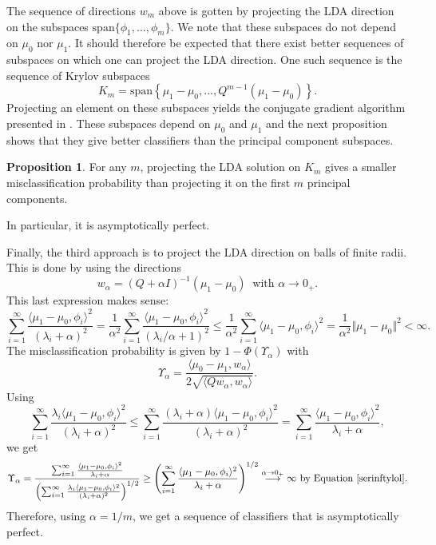 \documentclass[10pt, a4paper]{report}
\theoremstyle{definition}
\newtheorem{prop}{Proposition}
\theoremstyle{remark}
\begin{document}
The sequence of directions $w_m$ above is gotten by projecting the LDA direction on the subspaces $\mathrm{span}\{\phi_1,...,\phi_m\}$. We note that these subspaces do not depend on $\mu_0$ nor $\mu_1$. It should therefore be expected that there exist better sequences of subspaces on which one can project the LDA direction. One such sequence is the sequence of Krylov subspaces 
$$K_m = \mathrm{span}\left\{\mu_1-\mu_0,...,Q^{m-1}(\mu_1-\mu_0)\right\}.$$
Projecting an element on these subspaces yields the conjugate gradient algorithm presented in \cite[Algo.]{Kraus2}. These subspaces depend on $\mu_0$ and $\mu_1$ and the next proposition shows that they give better classifiers than the principal component subspaces. 
\begin{prop}\cite[Prop.]{Kraus2}
	For any $m$, projecting the LDA solution on $K_m$ gives a smaller misclassification probability than projecting it on the first $m$ principal components.
\end{prop}
In particular, it is asymptotically perfect.

Finally, the third approach is to project the LDA direction on balls of finite radii. This is done by using the directions 
$$w_\alpha = (Q + \alpha I)^{-1}(\mu_1-\mu_0) \ \text{ with } \alpha\to 0_+.$$  
This last expression makes sense:
$$\sum_{i=1}^{\infty} \frac{\langle \mu_1 -\mu_0, \phi_i\rangle^2 }{(\lambda_i + \alpha)^2} = \frac{1}{\alpha^2} \sum_{i=1}^{\infty} \frac{\langle \mu_1 -\mu_0, \phi_i\rangle^2 }{(\lambda_i/\alpha + 1)^2} \leq \frac{1}{\alpha^2} \sum_{i=1}^{\infty} \langle \mu_1 -\mu_0, \phi_i\rangle^2 = \frac{1}{\alpha^2}\Vert \mu_1-\mu_0 \Vert^2 < \infty.$$
The  misclassification probability is given by $1-\Phi(\Upsilon_\alpha)$ with
\begin{equation*}
	\Upsilon_\alpha  =  \frac{\langle\mu_0-\mu_1,w_\alpha\rangle}{2\sqrt{\langle Qw_\alpha,w_\alpha\rangle}}.
\end{equation*}
Using 
$$\sum_{i=1}^{\infty} \frac{\lambda_i \langle \mu_1 -\mu_0, \phi_i\rangle^2}{(\lambda_i + \alpha)^2} \leq \sum_{i=1}^{\infty} \frac{(\lambda_i+\alpha) \langle \mu_1 -\mu_0, \phi_i\rangle^2}{(\lambda_i + \alpha)^2} = \sum_{i=1}^{\infty} \frac{\langle \mu_1 -\mu_0, \phi_i\rangle^2}{\lambda_i + \alpha},$$
we get 
$$\Upsilon_\alpha = \frac{\sum_{i=1}^{\infty} \frac{\langle \mu_1 -\mu_0, \phi_i\rangle^2}{\lambda_i + \alpha}}{\left(\sum_{i=1}^{\infty} \frac{\lambda_i \langle \mu_1 -\mu_0, \phi_i\rangle^2}{(\lambda_i + \alpha)^2}\right)^{1/2}} \geq \left( \sum_{i=1}^{\infty} \frac{\langle \mu_1 -\mu_0, \phi_i\rangle^2}{\lambda_i + \alpha} \right)^{1/2} \stackrel{\alpha\to 0_+}{\longrightarrow} \infty \text{ by Equation \ref{serinftylol}.}$$
Therefore, using $\alpha = 1/m$, we get a sequence of classifiers that is asymptotically perfect.
\end{document}
